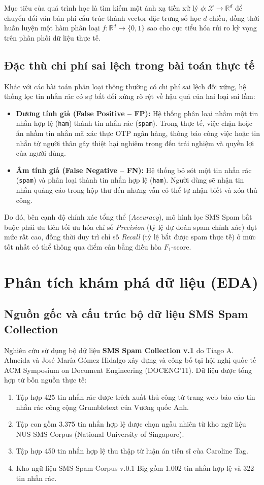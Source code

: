 \documentclass[12pt,a4paper]{report}
\begin{document}
Mục tiêu của quá trình học là tìm kiếm một ánh xạ tiền xử lý $\phi: \mathcal{X} \rightarrow \mathbb{R}^d$ để chuyển đổi văn bản phi cấu trúc thành vector đặc trưng số học $d$-chiều, đồng thời huấn luyện một hàm phân loại $f: \mathbb{R}^d \rightarrow \{0, 1\}$ sao cho cực tiểu hóa rủi ro kỳ vọng trên phân phối dữ liệu thực tế.

\subsection{Đặc thù chi phí sai lệch trong bài toán thực tế}
Khác với các bài toán phân loại thông thường có chi phí sai lệch đối xứng, hệ thống lọc tin nhắn rác có sự bất đối xứng rõ rệt về hậu quả của hai loại sai lầm:
\begin{itemize}
    \item \textbf{Dương tính giả (False Positive -- FP):} Hệ thống phân loại nhầm một tin nhắn hợp lệ (\texttt{ham}) thành tin nhắn rác (\texttt{spam}). Trong thực tế, việc chặn hoặc ẩn nhầm tin nhắn mã xác thực OTP ngân hàng, thông báo công việc hoặc tin nhắn từ người thân gây thiệt hại nghiêm trọng đến trải nghiệm và quyền lợi của người dùng.
    \item \textbf{Âm tính giả (False Negative -- FN):} Hệ thống bỏ sót một tin nhắn rác (\texttt{spam}) và phân loại thành tin nhắn hợp lệ (\texttt{ham}). Người dùng sẽ nhận tin nhắn quảng cáo trong hộp thư đến nhưng vẫn có thể tự nhận biết và xóa thủ công.
\end{itemize}

Do đó, bên cạnh độ chính xác tổng thể (\textit{Accuracy}), mô hình lọc SMS Spam bắt buộc phải ưu tiên tối ưu hóa chỉ số \textit{Precision} (tỷ lệ dự đoán spam chính xác) đạt mức rất cao, đồng thời duy trì chỉ số \textit{Recall} (tỷ lệ bắt được spam thực tế) ở mức tốt nhất có thể thông qua điểm cân bằng điều hòa $F_1$-score.

\section{Phân tích khám phá dữ liệu (EDA)}
\subsection{Nguồn gốc và cấu trúc bộ dữ liệu SMS Spam Collection}
Nghiên cứu sử dụng bộ dữ liệu \textbf{SMS Spam Collection v.1} do Tiago A. Almeida và José María Gómez Hidalgo xây dựng và công bố tại hội nghị quốc tế ACM Symposium on Document Engineering (DOCENG'11). Dữ liệu được tổng hợp từ bốn nguồn thực tế:
\begin{enumerate}
    \item Tập hợp 425 tin nhắn rác được trích xuất thủ công từ trang web báo cáo tin nhắn rác công cộng Grumbletext của Vương quốc Anh.
    \item Tập con gồm 3.375 tin nhắn hợp lệ được chọn ngẫu nhiên từ kho ngữ liệu NUS SMS Corpus (National University of Singapore).
    \item Tập hợp 450 tin nhắn hợp lệ thu thập từ luận án tiến sĩ của Caroline Tag.
    \item Kho ngữ liệu SMS Spam Corpus v.0.1 Big gồm 1.002 tin nhắn hợp lệ và 322 tin nhắn rác.
\end{enumerate}
\end{document}

